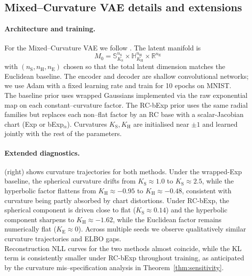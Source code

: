 \documentclass{article}
\theoremstyle{definition}
\theoremstyle{remark}
\newcommand{\SSS}{\mathbb{S}}
\newcommand{\HH}{\mathbb{H}}
\begin{document}
\subsection*{Mixed--Curvature VAE details and extensions}
\label{app:E5_details}

\paragraph{Architecture and training.}
For the Mixed--Curvature VAE we follow \citet{skopek2019mixed}.
The latent manifold is
\[
M_0 = \SSS^{n_{\mathrm{S}}}_{K_{\mathrm{S}}}
      \times \HH^{n_{\mathrm{H}}}_{K_{\mathrm{H}}}
      \times \mathbb{R}^{n_{\mathrm{E}}}
\]
with $(n_{\mathrm{S}}, n_{\mathrm{H}}, n_{\mathrm{E}})$ chosen so that the total latent dimension matches the
Euclidean baseline.
The encoder and decoder are shallow convolutional networks; we use Adam with a fixed learning
rate and train for 10 epochs on MNIST.\\

The baseline prior uses wrapped Gaussians implemented via the raw exponential map on each
constant--curvature factor.
The RC-bExp prior uses the same radial families but replaces each non--flat factor by an RC
base with a scalar-Jacobian chart (Exp or bExp$_\alpha$).
Curvatures $K_{\mathrm{S}}, K_{\mathrm{H}}$ are initialised near $\pm 1$ and learned jointly with the rest of
the parameters.

\paragraph{Extended diagnostics.} (right) shows curvature trajectories for both methods.
Under the wrapped-Exp baseline, the spherical curvature drifts from
$K_{\mathrm{S}} \approx 1.0$ to $K_{\mathrm{S}} \approx 2.5$, while the hyperbolic factor flattens from
$K_{\mathrm{H}} \approx -0.95$ to $K_{\mathrm{H}} \approx -0.48$, consistent with curvature being partly
absorbed by chart distortions.
Under RC-bExp, the spherical component is driven close to flat
($K_{\mathrm{S}} \approx 0.14$) and the hyperbolic component sharpens to
$K_{\mathrm{H}} \approx -1.62$, while the Euclidean factor remains numerically flat
($K_{\mathrm{E}} \approx 0$).
Across multiple seeds we observe qualitatively similar curvature trajectories and ELBO gaps.\\

Reconstruction NLL curves for the two methods almost coincide, while the KL term is
consistently smaller under RC-bExp throughout training, as anticipated by the curvature
mis--specification analysis in Theorem~\ref{thm:sensitivity}.
\end{document}

